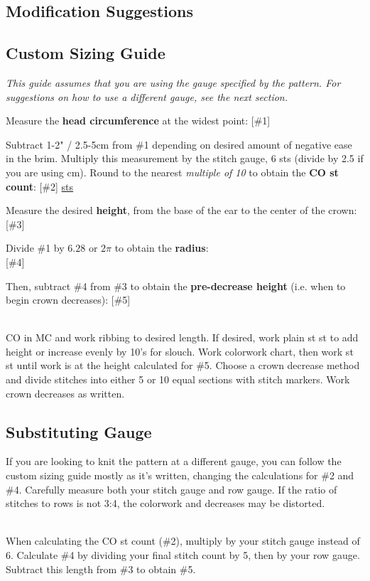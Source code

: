 \documentclass[12pt]{article}
\begin{document}
\begin{multicols}{2}
\section*{Modification Suggestions}

\subsection*{Custom Sizing Guide}

\emph{\small This guide assumes that you are using the gauge specified by the pattern. For suggestions on how to use a different gauge, see the next section.}

Measure the \textbf{head circumference} at the widest point: \hfill [\#1] \underline{\hspace{5em}}

Subtract 1-2" / 2.5-5cm from \#1 depending on desired amount of negative ease in the brim. Multiply this measurement by the stitch gauge, 6 sts (divide by 2.5 if you are using cm). Round to the nearest \emph{multiple of 10} to obtain the \textbf{CO st count}: \hspace{\fill}[\#2] \underline{\hspace{4em} sts}

Measure the desired \textbf{height}, from the base of the ear to the center of the crown:\hspace{\fill} [\#3] \underline{\hspace{3em}}

Divide \#1 by $6.28$ or $2\pi$ to obtain the \textbf{radius}:\\ \hfill [\#4] \underline{\hspace{5em}}

Then, subtract \#4 from \#3 to obtain the \textbf{pre-decrease height} (i.e. when to begin crown decreases): \hfill [\#5] \underline{\hspace{5em}}

~\\
CO in MC and work ribbing to desired length. If desired, work plain st st to add height or increase evenly by 10's for slouch. Work colorwork chart, then work st st until work is at the height calculated for \#5. Choose a crown decrease method and divide stitches into either 5 or 10 equal sections with stitch markers. Work crown decreases as written.

\subsection*{Substituting Gauge}

If you are looking to knit the pattern at a different gauge, you can follow the custom sizing guide mostly as it's written, changing the calculations for \#2 and \#4. Carefully measure both your stitch gauge and row gauge. If the ratio of stitches to rows is not 3:4, the colorwork and decreases may be distorted.

~\\
When calculating the CO st count (\#2), multiply by your stitch gauge instead of 6. Calculate \#4 by dividing your final stitch count by 5, then by your row gauge. Subtract this length from \#3 to obtain \#5.\end{multicols}
\end{document}
